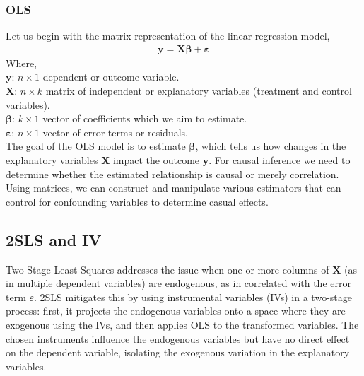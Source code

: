 \subsubsection{OLS}
Let us begin with the matrix representation of the linear regression model,
\begin{align}
\mathbf{y} = \mathbf{X}\boldsymbol{\beta} + \boldsymbol{\varepsilon}
\end{align}
Where,\\
\(\mathbf{y}\): \(n \times 1\) dependent or outcome variable.\\
\(\mathbf{X}\): \(n \times k\) matrix of independent or explanatory variables (treatment and control variables).\\
\(\boldsymbol{\beta}\): \(k \times 1\) vector of coefficients which we aim to estimate.\\
\(\boldsymbol{\varepsilon}\): \(n \times 1\) vector of error terms or residuals.\\
The goal of the OLS model is to estimate \(\boldsymbol{\beta}\), which tells us how changes in the explanatory variables \(\mathbf{X}\) impact the outcome \(\mathbf{y}\). For causal inference we need to determine whether the estimated relationship is causal or merely correlation. Using matrices, we can construct and manipulate various estimators that can control for confounding variables to determine casual effects. 
\subsection {2SLS and IV}
Two-Stage Least Squares addresses the issue when one or more columns of \(\mathbf{X}\) (as in multiple dependent variables) are endogenous, as in correlated with the error term \(\varepsilon\). 2SLS mitigates this by using instrumental variables (IVs) in a two-stage process: first, it projects the endogenous variables onto a space where they are exogenous using the IVs, and then applies OLS to the transformed variables. The chosen instruments influence the endogenous variables but have no direct effect on the dependent variable, isolating the exogenous variation in the explanatory variables.
